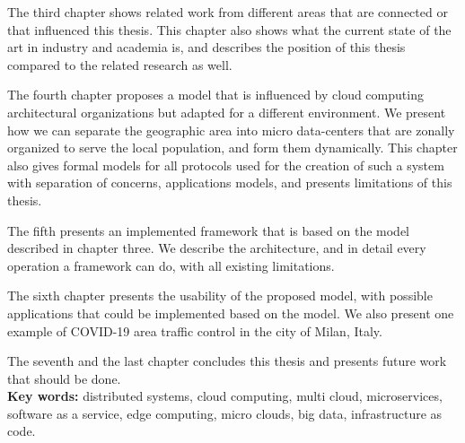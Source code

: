 The third chapter shows related work from different areas that are connected or that influenced this thesis. This chapter also shows what the current state of the art in industry and academia is, and describes the position of this thesis compared to the related research as well.

The fourth chapter proposes a model that is influenced by cloud computing architectural organizations but adapted for a different environment. We present how we can separate the geographic area into micro data-centers that are zonally organized to serve the local population, and form them dynamically. This chapter also gives formal models for all protocols used for the creation of such a system with separation of concerns, applications models, and presents limitations of this thesis.

The fifth presents an implemented framework that is based on the model described in chapter three. We describe the architecture, and in detail every operation a framework can do, with all existing limitations.

The sixth chapter presents the usability of the proposed model, with possible applications that could be implemented based on the model. We also present one example of COVID-19 area traffic control in the city of Milan, Italy.

The seventh and the last chapter concludes this thesis and presents future work that should be done.\\ 

\noindent
\textbf{Key words:} distributed systems, cloud computing, multi cloud, microservices, software as a service, edge computing, micro clouds, big data, infrastructure as code.